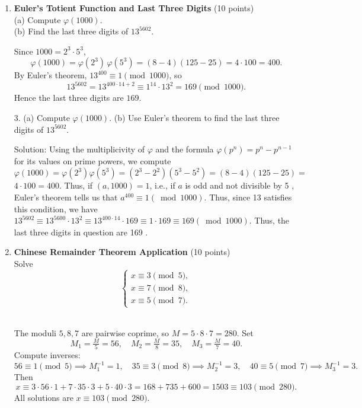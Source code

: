 \begin{enumerate}
  \item \textbf{Euler's Totient Function and Last Three Digits} (10 points)\\
  (a) Compute \(\varphi(1000)\).\\
  (b) Find the last three digits of \(13^{5602}\).\\
  \begin{subanswer}
  Since \(1000=2^3\cdot5^3\),
  \[
    \varphi(1000)
    =\varphi(2^3)\,\varphi(5^3)
    =(8-4)(125-25)
    =4\cdot100
    =400.
  \]
  By Euler’s theorem, \(13^{400}\equiv1\pmod{1000}\), so
  \[
    13^{5602}
    =13^{400\cdot14+2}
    \equiv1^{14}\cdot13^2
    =169
    \pmod{1000}.
  \]
  Hence the last three digits are \(169\).
  \end{subanswer}
  3. (a) Compute $\varphi(1000)$.
  (b) Use Euler's theorem to find the last three digits of $13^{5602}$.
  
  Solution:
  Using the multiplicivity of $\varphi$ and the formula $\varphi\left(p^n\right)=p^n-p^{n-1}$ for its values on prime powers, we compute $\varphi(1000)=\varphi\left(2^3\right) \varphi\left(5^3\right)=\left(2^3-2^2\right)\left(5^3-5^2\right)=(8-4)(125-25)=$ $4 \cdot 100=400$. Thus, if $(a, 1000)=1$, i.e., if $a$ is odd and not divisible by 5 , Euler's theorem tells us that $a^{400} \equiv 1(\bmod 1000)$. Thus, since 13 satisfies this condition, we have $13^{5602} \equiv 13^{5600} \cdot 13^2 \equiv 13^{400 \cdot 14} \cdot 169 \equiv 1 \cdot 169 \equiv 169(\bmod 1000)$. Thus, the last three digits in question are 169 .
  

  \item \textbf{Chinese Remainder Theorem Application} (10 points)\\
  Solve
  \[
    \begin{cases}
      x\equiv3\pmod5,\\
      x\equiv7\pmod8,\\
      x\equiv5\pmod7.
    \end{cases}
  \]\\
  \begin{subanswer}
  The moduli \(5,8,7\) are pairwise coprime, so \(M=5\cdot8\cdot7=280\).  Set
  \[
    M_1=\tfrac{M}{5}=56,\quad
    M_2=\tfrac{M}{8}=35,\quad
    M_3=\tfrac{M}{7}=40.
  \]
  Compute inverses:
  \[
    56\equiv1\pmod5\implies M_1^{-1}=1,\quad
    35\equiv3\pmod8\implies M_2^{-1}=3,\quad
    40\equiv5\pmod7\implies M_3^{-1}=3.
  \]
  Then
  \[
    x
    \equiv3\cdot56\cdot1
      +7\cdot35\cdot3
      +5\cdot40\cdot3
    =168+735+600
    =1503
    \equiv103\pmod{280}.
  \]
  All solutions are \(x\equiv103\pmod{280}\).
  \end{subanswer}


\end{enumerate}
